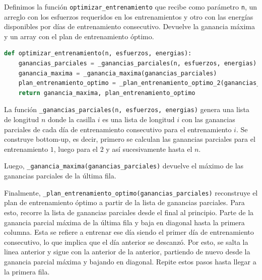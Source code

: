Definimos la función \texttt{optimizar\_entrenamiento} que recibe como parámetro \texttt{n}, un arreglo con los esfuerzos requeridos
en los entrenamientos y otro con las energías disponibles por días de entrenamiento consecutivo. Devuelve la ganancia máxima y un array
con el plan de entrenamiento óptimo.

\begin{lstlisting}[language=Python]
def optimizar_entrenamiento(n, esfuerzos, energias):
    ganancias_parciales = _ganancias_parciales(n, esfuerzos, energias)
    ganancia_maxima = _ganancia_maxima(ganancias_parciales)
    plan_entrenamiento_optimo = _plan_entrenamiento_optimo_2(ganancias_parciales)
    return ganancia_maxima, plan_entrenamiento_optimo
\end{lstlisting}

La función \texttt{\_ganancias\_parciales(n, esfuerzos, energias)} genera una lista de longitud $n$ donde
la casilla $i$ es una lista de longitud $i$ con las ganancias parciales de cada día de entrenamiento
consecutivo para el entrenamiento $i$. Se construye bottom-up, es decir, primero se calculan las ganancias
parciales para el entrenamiento $1$, luego para el $2$ y así sucesivamente hasta el $n$.

Luego, \texttt{\_ganancia\_maxima(ganancias\_parciales)} devuelve el máximo de las ganancias parciales de la
última fila.

Finalmente, \texttt{\_plan\_entrenamiento\_optimo(ganancias\_parciales)} reconstruye el plan de entrenamiento
óptimo a partir de la lista de ganancias parciales. Para esto, recorre la lista de ganancias parciales desde
el final al principio. Parte de la ganancia parcial máxima de la última fila y baja en diagonal hasta la
primera columna. Esta se refiere a entrenar ese día siendo el primer día de entrenamiento consecutivo, lo que
implica que el día anterior se descanzó. Por esto, se salta la linea anterior y sigue con la anterior de la
anterior, partiendo de nuevo desde la ganancia parcial máxima y bajando en diagonal. Repite estos pasos hasta
llegar a la primera fila.
